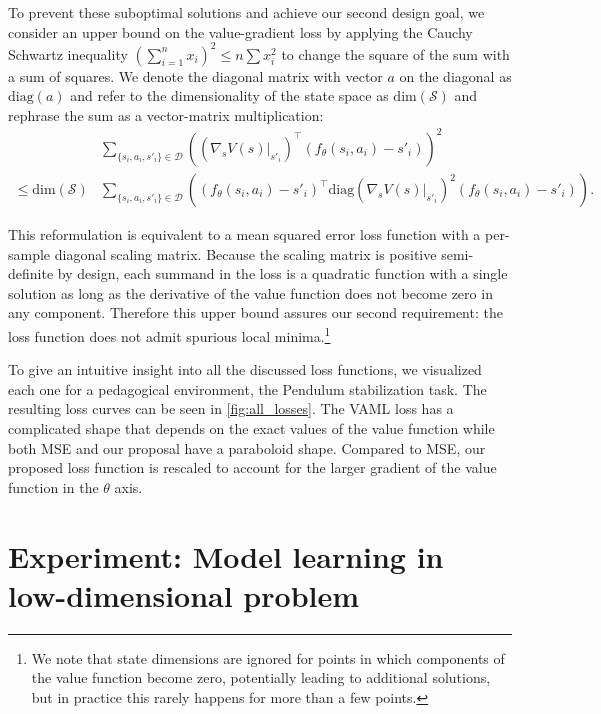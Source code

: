 To prevent these suboptimal solutions and achieve our second design goal, we consider an upper bound on the value-gradient loss by applying the Cauchy Schwartz inequality $\left(\sum_{i=1}^n x_i \right) ^2 \leq n \sum x_i^2$ to change the square of the sum with a sum of squares.
We denote the diagonal matrix with vector $a$ on the diagonal as $\text{diag}(a)$ and refer to the dimensionality of the state space as $\text{dim}(\mathcal{S})$ and rephrase the sum as a vector-matrix multiplication:
\begin{align}
    &\sum_{\{s_i,a_i,s'_i\}\in\mathcal{D}} {\left((\nabla_s V(s)|_{s'_i})^\intercal(f_\theta(s_i,a_i) - s'_i) \right)^2}\\
    \leq {\text{dim}(\mathcal{S})} &\sum_{\{s_i,a_i,s'_i\}\in\mathcal{D}}\left((f_\theta(s_i,a_i) - s'_i)^\intercal\text{diag}(\nabla_s V(s)|_{s'_i})^2(f_\theta(s_i,a_i) - s'_i) \right) \label{eq:upper_bound}.
\end{align}

This reformulation is equivalent to a mean squared error loss function with a per-sample diagonal scaling matrix.
Because the scaling matrix is positive semi-definite by design, each summand in the loss is a quadratic function with a single solution as long as the derivative of the value function does not become zero in any component.
Therefore this upper bound assures our second requirement: the loss function does not admit spurious local minima.\footnote{We note that state dimensions are ignored for points in which components of the value function become zero, potentially leading to additional solutions, but in practice this rarely happens for more than a few points.}

To give an intuitive insight into all the discussed loss functions, we visualized each one for a pedagogical environment, the Pendulum stabilization task.
The resulting loss curves can be seen in \autoref{fig:all_losses}.
The VAML loss has a complicated shape that depends on the exact values of the value function while both MSE and our proposal have a paraboloid shape.
Compared to MSE, our proposed loss function is rescaled to account for the larger gradient of the value function in the $\theta$ axis.

\section{Experiment: Model learning in low-dimensional problem}
\label{sec:experiments}

